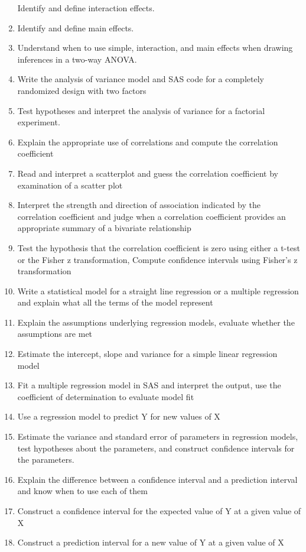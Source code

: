 \documentclass[]{book}
\begin{document}
\begin{enumerate}
  Identify and define interaction effects.
\item
  Identify and define main effects.
\item
  Understand when to use simple, interaction, and main effects when drawing inferences in a two-way ANOVA.
\item
  Write the analysis of variance model and SAS code for a completely randomized design with two factors
\item
  Test hypotheses and interpret the analysis of variance for a factorial experiment.
\item
  Explain the appropriate use of correlations and compute the correlation coefficient
\item
  Read and interpret a scatterplot and guess the correlation coefficient by examination of a scatter plot
\item
  Interpret the strength and direction of association indicated by the correlation coefficient and judge when a correlation coefficient provides an appropriate summary of a bivariate relationship
\item
  Test the hypothesis that the correlation coefficient is zero using either a t-test or the Fisher z transformation, Compute confidence intervals using Fisher's z transformation
\item
  Write a statistical model for a straight line regression or a multiple regression and explain what all the terms of the model represent
\item
  Explain the assumptions underlying regression models, evaluate whether the assumptions are met
\item
  Estimate the intercept, slope and variance for a simple linear regression model
\item
  Fit a multiple regression model in SAS and interpret the output, use the coefficient of determination to evaluate model fit
\item
  Use a regression model to predict Y for new values of X
\item
  Estimate the variance and standard error of parameters in regression models, test hypotheses about the parameters, and construct confidence intervals for the parameters.
\item
  Explain the difference between a confidence interval and a prediction interval and know when to use each of them
\item
  Construct a confidence interval for the expected value of Y at a given value of X
\item
  Construct a prediction interval for a new value of Y at a given value of X

\end{enumerate}
\end{document}
